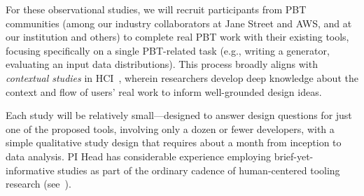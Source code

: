 For these
observational studies, we will recruit participants
from PBT communities (among our industry collaborators at Jane Street and AWS,
and at our institution and others) to complete real PBT work with their
existing tools, focusing specifically on a single PBT-related task
(e.g., writing a generator, evaluating an input data
distributions). This process broadly aligns with
\emph{contextual studies} in HCI~\cite[Chapter
3]{ref:holtzblatt1997contextual}, wherein researchers develop deep
knowledge about the context and flow of users' real work to inform
well-grounded design
ideas.

Each study will be relatively small---designed to answer
design questions for just one of the proposed tools,
involving only a dozen or fewer developers, with a simple qualitative study
design that requires about a month from inception to data analysis.
PI Head has considerable experience employing brief-yet-informative
studies as part of the ordinary cadence of
human-centered tooling research
(see~\cite{ref:fok2023scim,ref:august2022paper,ref:head2021augmenting,ref:head2018interactive}).




